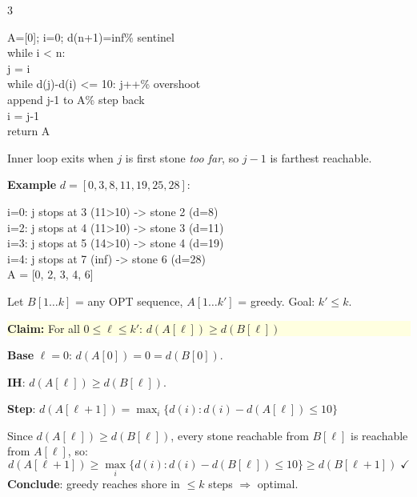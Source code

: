\documentclass[9pt]{extarticle}
\newcommand{\yb}[1]{\vspace{1pt}\noindent\colorbox{lightyellow}{\parbox{\dimexpr\linewidth-2\fboxsep}{\footnotesize\sffamily #1}}\vspace{1pt}}
\newcommand{\cd}[1]{{\fontsize{7}{8.5}\selectfont\ttfamily\noindent #1}}
\begin{document}
\begin{multicols}{3}
\begin{tcolorbox}[green,title=GreedyJump --- Algorithm]
\vspace{2pt}
\cd{A=[0]; i=0; d(n+1)=inf\hfill\% sentinel\\
while i < n:\\
\quad j = i\\
\quad while d(j)-d(i) <= 10: j++\hfill\% overshoot\\
\quad append j-1 to A\hfill\% step back\\
\quad i = j-1\\
return A}

\vspace{2pt}Inner loop exits when $j$ is first stone \textit{too far}, so $j{-}1$ is farthest reachable.

\vspace{2pt}\textbf{Example} $d{=}[0,3,8,11,19,25,28]$:

\cd{i=0: j stops at 3 (11>10) -> stone 2 (d=8)\\
i=2: j stops at 4 (11>10) -> stone 3 (d=11)\\
i=3: j stops at 5 (14>10) -> stone 4 (d=19)\\
i=4: j stops at 7 (inf)   -> stone 6 (d=28)\\
A = [0, 2, 3, 4, 6]}
\end{tcolorbox}

\vspace{3pt}
\begin{tcolorbox}[green,title=GreedyJump --- Correctness Proof]
\small
Let $B[1{\ldots}k]$ = any OPT sequence, $A[1{\ldots}k']$ = greedy. Goal: $k'\leq k$.

\yb{\textbf{Claim:} For all $0\leq\ell\leq k'$: $d(A[\ell])\geq d(B[\ell])$}

\textbf{Base} $\ell{=}0$: $d(A[0])=0=d(B[0])$. \checkmark

\textbf{IH}: $d(A[\ell])\geq d(B[\ell])$.

\textbf{Step}: $d(A[\ell{+}1])=\max_i\{d(i):d(i){-}d(A[\ell])\leq 10\}$

Since $d(A[\ell])\geq d(B[\ell])$, every stone reachable from $B[\ell]$ is reachable from $A[\ell]$, so:
\[d(A[\ell{+}1])\geq\max_i\{d(i):d(i){-}d(B[\ell])\leq 10\}\geq d(B[\ell{+}1])\;\checkmark\]
\textbf{Conclude}: greedy reaches shore in $\leq k$ steps $\Rightarrow$ optimal.
\end{tcolorbox}


\end{multicols}
\end{document}
